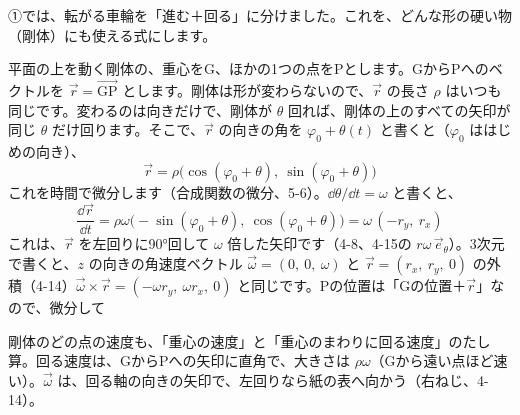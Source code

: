 \phkokomade


\leavevmode\label{ph:力-7:sec5}①では、転がる車輪を「進む＋回る」に分けました。これを、どんな形の硬い物（剛体）にも使える式にします。

平面の上を動く剛体の、重心をG、ほかの1つの点をPとします。GからPへのベクトルを $\vec r=\overrightarrow{\mathrm{GP}}$ とします。剛体は形が変わらないので、$\vec r$ の長さ $\rho$ はいつも同じです。変わるのは向きだけで、剛体が $\theta$ 回れば、剛体の上のすべての矢印が同じ $\theta$ だけ回ります。そこで、$\vec r$ の向きの角を $\varphi_0+\theta(t)$ と書くと（$\varphi_0$ ははじめの向き）、
\[\vec r=\rho\bigl(\cos(\varphi_0+\theta),\ \sin(\varphi_0+\theta)\bigr)\]
これを時間で微分します（合成関数の微分、5-6）。$\dd\theta/\dd t=\omega$ と書くと、
\[\frac{\dd\vec r}{\dd t}=\rho\omega\bigl(-\sin(\varphi_0+\theta),\ \cos(\varphi_0+\theta)\bigr)=\omega\,(-r_y,\ r_x)\]
これは、$\vec r$ を左回りに\ang{90}回して $\omega$ 倍した矢印です（4-8、4-15の $r\omega\,\vec e_\theta$）。3次元で書くと、$z$ の向きの角速度ベクトル $\vec\omega=(0,\ 0,\ \omega)$ と $\vec r=(r_x,\ r_y,\ 0)$ の外積（4-14）$\vec\omega\times\vec r=(-\omega r_y,\ \omega r_x,\ 0)$ と同じです。Pの位置は「Gの位置＋$\vec r$」なので、微分して
\begin{phyomi}[$\vec v_\mathrm{P}=\vec v_\mathrm{G}+\vec\omega\times\vec r$]
剛体のどの点の速度も、「重心の速度」と「重心のまわりに回る速度」のたし算。回る速度は、GからPへの矢印に直角で、大きさは $\rho\omega$（Gから遠い点ほど速い）。$\vec\omega$ は、回る軸の向きの矢印で、左回りなら紙の表へ向かう（右ねじ、4-14）。
\end{phyomi}
